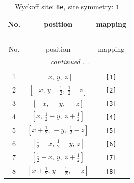 \documentclass[fleqn,8pt]{jsarticle}
\begin{document}
\renewcommand{\arraystretch}{1.2}
\begin{longtable}{ccc}
\caption{Wyckoff site: {\tt 8e}, site symmetry: {\tt 1}}
 \\
 \hline \hline
No. & position & mapping \\ \hline \endfirsthead

\multicolumn{2}{l}{\tablename\ \thetable{}} \\
 \hline \hline
No. & position & mapping \\ \hline \endhead

 \hline \hline
\multicolumn{2}{r}{\footnotesize\it continued ...} \\ \endfoot

 \hline \hline
\multicolumn{2}{r}{} \\ \endlastfoot

1 & $\left[ x,\, y,\, z \right]$ & {\tt [1]} \\ \hline
2 & $\left[ - x,\, y + \frac{1}{2},\, \frac{1}{2} - z \right]$ & {\tt [2]} \\ \hline
3 & $\left[ - x,\, - y,\, - z \right]$ & {\tt [3]} \\ \hline
4 & $\left[ x,\, \frac{1}{2} - y,\, z + \frac{1}{2} \right]$ & {\tt [4]} \\ \hline
5 & $\left[ x + \frac{1}{2},\, - y,\, \frac{1}{2} - z \right]$ & {\tt [5]} \\ \hline
6 & $\left[ \frac{1}{2} - x,\, \frac{1}{2} - y,\, z \right]$ & {\tt [6]} \\ \hline
7 & $\left[ \frac{1}{2} - x,\, y,\, z + \frac{1}{2} \right]$ & {\tt [7]} \\ \hline
8 & $\left[ x + \frac{1}{2},\, y + \frac{1}{2},\, - z \right]$ & {\tt [8]} \\
\end{longtable}
\end{document}

